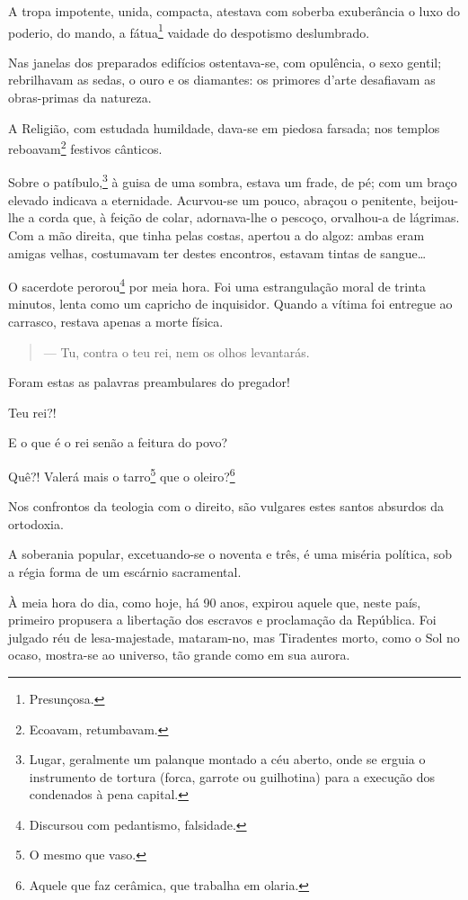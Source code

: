 A tropa impotente, unida, compacta, atestava com soberba exuberância o
luxo do poderio, do mando, a fátua\footnote{Presunçosa.} vaidade do
despotismo deslumbrado.

Nas janelas dos preparados edifícios ostentava-se, com opulência, o sexo
gentil; rebrilhavam as sedas, o ouro e os diamantes: os primores d'arte
desafiavam as obras-primas da natureza.

A Religião, com estudada humildade, dava-se em piedosa farsada; nos
templos reboavam\footnote{Ecoavam, retumbavam.} festivos cânticos.

Sobre o patíbulo,\footnote{Lugar, geralmente um palanque montado a céu
  aberto, onde se erguia o instrumento de tortura (forca, garrote ou
  guilhotina) para a execução dos condenados à pena capital.} à guisa
de uma sombra, estava um frade, de pé; com um braço elevado indicava a
eternidade. Acurvou-se um pouco, abraçou o penitente, beijou-lhe a corda
que, à feição de colar, adornava-lhe o pescoço, orvalhou-a de lágrimas.
Com a mão direita, que tinha pelas costas, apertou a do algoz: ambas
eram amigas velhas, costumavam ter destes encontros, estavam tintas de
sangue\ldots{}

O sacerdote perorou\footnote{Discursou com pedantismo, falsidade.} por
meia hora. Foi uma estrangulação moral de trinta minutos, lenta como um
capricho de inquisidor. Quando a vítima foi entregue ao carrasco,
restava apenas a morte física.

\begin{quote}
--- Tu, contra o teu rei, nem os olhos levantarás.
\end{quote}

Foram estas as palavras preambulares do pregador!

Teu rei?!

E o que é o rei senão a feitura do povo?

Quê?! Valerá mais o tarro\footnote{O mesmo que vaso.} que o
oleiro?\footnote{Aquele que faz cerâmica, que trabalha em olaria.}

Nos confrontos da teologia com o direito, são vulgares estes santos
absurdos da ortodoxia.

A soberania popular, excetuando-se o noventa e três, é uma miséria
política, sob a régia forma de um escárnio sacramental.

\noindent\dotfill{}

À meia hora do dia, como hoje, há 90 anos, expirou aquele que, neste
país, primeiro propusera a libertação dos escravos e proclamação da
República. Foi julgado réu de lesa-majestade, mataram-no, mas Tiradentes
morto, como o Sol no ocaso, mostra-se ao universo, tão grande como em
sua aurora.

